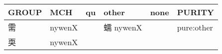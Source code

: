 \documentclass[14pt,a4paper]{scrartcl}
\begin{document}
\begin{longtable}[c]{@{}llllll@{}}
\toprule
\begin{minipage}[b]{0.14\columnwidth}\raggedright\strut
GROUP
\strut\end{minipage} &
\begin{minipage}[b]{0.14\columnwidth}\raggedright\strut
MCH
\strut\end{minipage} &
\begin{minipage}[b]{0.14\columnwidth}\raggedright\strut
qu
\strut\end{minipage} &
\begin{minipage}[b]{0.14\columnwidth}\raggedright\strut
other
\strut\end{minipage} &
\begin{minipage}[b]{0.14\columnwidth}\raggedright\strut
none
\strut\end{minipage} &
\begin{minipage}[b]{0.14\columnwidth}\raggedright\strut
PURITY
\strut\end{minipage}\tabularnewline
\midrule
\endhead
\begin{minipage}[t]{0.14\columnwidth}\raggedright\strut
需
\strut\end{minipage} &
\begin{minipage}[t]{0.14\columnwidth}\raggedright\strut
nywenX
\strut\end{minipage} &
\begin{minipage}[t]{0.14\columnwidth}\raggedright\strut
\strut\end{minipage} &
\begin{minipage}[t]{0.14\columnwidth}\raggedright\strut
蠕 nywenX
\strut\end{minipage} &
\begin{minipage}[t]{0.14\columnwidth}\raggedright\strut
\strut\end{minipage} &
\begin{minipage}[t]{0.14\columnwidth}\raggedright\strut
pure:other
\strut\end{minipage}\tabularnewline
\begin{minipage}[t]{0.14\columnwidth}\raggedright\strut
耎
\strut\end{minipage} &
\begin{minipage}[t]{0.14\columnwidth}\raggedright\strut
nywenX
\strut\end{minipage} &
\begin{minipage}[t]{0.14\columnwidth}\raggedright\strut
\strut\end{minipage} &
\begin{minipage}[t]{0.14\columnwidth}\raggedright\strut

\end{minipage}
\end{longtable}
\end{document}
